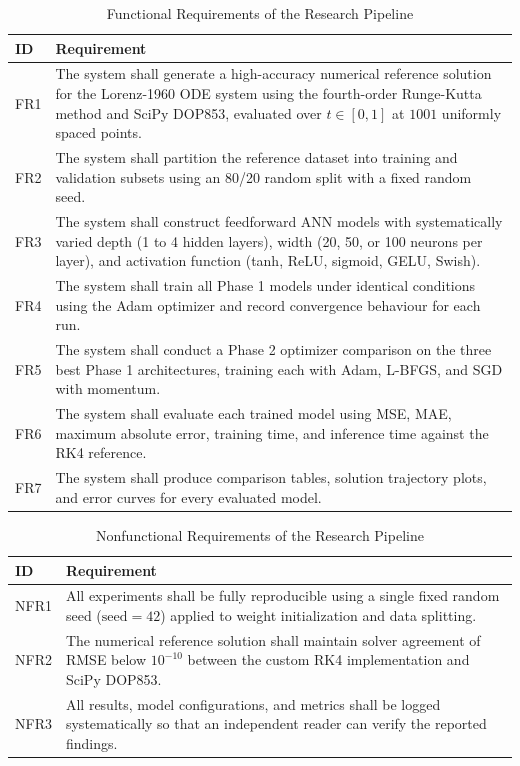 \begin{table}[H]
\centering
\caption{Functional Requirements of the Research Pipeline}
\label{tab:fr}
\renewcommand{\arraystretch}{1.2}
\begin{tabular}{|p{1.2cm}|p{12.5cm}|}
\hline
\textbf{ID} & \textbf{Requirement} \\
\hline
FR1 & The system shall generate a high-accuracy numerical reference solution for the Lorenz-1960 ODE system using the fourth-order Runge-Kutta method and SciPy DOP853, evaluated over $t \in [0, 1]$ at $1001$ uniformly spaced points. \\
\hline
FR2 & The system shall partition the reference dataset into training and validation subsets using an 80/20 random split with a fixed random seed. \\
\hline
FR3 & The system shall construct feedforward ANN models with systematically varied depth (1 to 4 hidden layers), width (20, 50, or 100 neurons per layer), and activation function (tanh, ReLU, sigmoid, GELU, Swish). \\
\hline
FR4 & The system shall train all Phase 1 models under identical conditions using the Adam optimizer and record convergence behaviour for each run. \\
\hline
FR5 & The system shall conduct a Phase 2 optimizer comparison on the three best Phase 1 architectures, training each with Adam, L-BFGS, and SGD with momentum. \\
\hline
FR6 & The system shall evaluate each trained model using MSE, MAE, maximum absolute error, training time, and inference time against the RK4 reference. \\
\hline
FR7 & The system shall produce comparison tables, solution trajectory plots, and error curves for every evaluated model. \\
\hline
\end{tabular}
\end{table}

\begin{table}[H]
\centering
\caption{Nonfunctional Requirements of the Research Pipeline}
\label{tab:nfr}
\renewcommand{\arraystretch}{1.2}
\begin{tabular}{|p{1.5cm}|p{12.2cm}|}
\hline
\textbf{ID} & \textbf{Requirement} \\
\hline
NFR1 & All experiments shall be fully reproducible using a single fixed random seed ($\text{seed}=42$) applied to weight initialization and data splitting. \\
\hline
NFR2 & The numerical reference solution shall maintain solver agreement of RMSE below $10^{-10}$ between the custom RK4 implementation and SciPy DOP853. \\
\hline
NFR3 & All results, model configurations, and metrics shall be logged systematically so that an independent reader can verify the reported findings. \\
\hline
\end{tabular}
\end{table}

